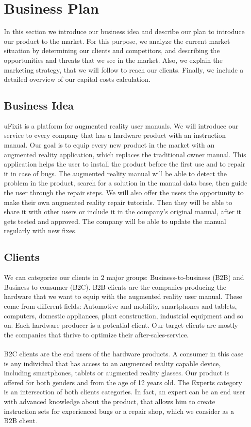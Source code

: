 \chapter{Business Plan}
	In this section we introduce our business idea and describe our plan to introduce our product to the market. For this purpose, we analyze the current market situation by determining our clients and competitors, and describing the opportunities and threats that we see in the market. Also, we explain the marketing strategy, that we will follow to reach our clients. Finally, we include a detailed overview of our capital costs calculation.

\section{Business Idea}
	uFixit is a platform for augmented reality user manuals. We will introduce our service to every company that has a hardware product with an instruction manual. Our goal is to equip every new product in the market with an augmented reality application, which replaces the traditional owner manual. This application helps the user to install the product before the first use and to repair it in case of bugs. The augmented reality manual will be able to detect the problem in the product, search for a solution in the manual data base, then guide the user through the repair steps. We will also offer the users the opportunity to make their own augmented reality repair tutorials. Then they will be able to share it with other users or include it in the company's original manual, after it gets tested and approved. The company will be able to update the manual regularly with new fixes. 

\section{Clients}
	We can categorize our clients in $2$ major groups: Business-to-business (B2B) and Business-to-consumer (B2C). B2B clients are the companies producing the hardware that we want to equip with the augmented reality user manual. These come from different fields:  Automotive and mobility, smartphones and tablets, computers, domestic appliances, plant construction, industrial equipment and so on. Each hardware producer is a potential client. Our target clients are mostly the companies that thrive to optimize their after-sales-service. 
	\\
	\\
	B2C clients are the end users of the hardware products. A consumer in this case is any individual that has access to an augmented reality capable device, including smartphones, tablets or augmented reality glasses. Our product is offered for both genders and from the age of 12 years old. The Experts category is an intersection of both clients categories. In fact, an expert can be an end user with advanced knowledge about the product, that allows him to create instruction sets for experienced bugs or a repair shop, which we consider as a B2B client.

